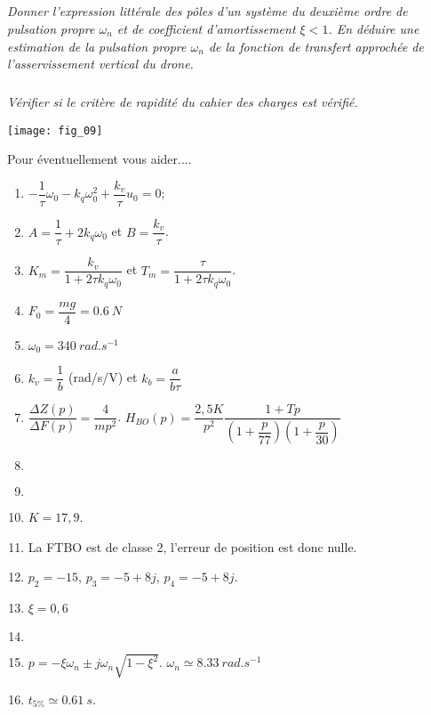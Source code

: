 \begin{multicols}{2}
\subparagraph{}\textit{Donner l’expression littérale des pôles d’un système du deuxième ordre de pulsation propre $\omega_n$ et de coefficient d’amortissement $\xi<1$. En déduire une estimation de la pulsation propre $\omega_n$ de la
fonction de transfert approchée de l’asservissement vertical du drone.}

\subparagraph{}\textit{Vérifier si le critère de rapidité du cahier des charges est vérifié.}

\begin{center}
\texttt{[image: fig\_09]}
\end{center}





Pour éventuellement vous aider....
\begin{enumerate}
\item $-\dfrac{1}{\tau}\omega_0 - k_q \omega_0^2 + \dfrac{k_v}{\tau}u_0=0$;
\item $A=\dfrac{1}{\tau}+2k_q\omega_0$ et $B=\dfrac{k_v}{\tau}$.
\item $K_m=\dfrac{k_v}{1+2\tau k_q \omega_0}$ et $T_m=\dfrac{\tau}{1+2\tau k_q \omega_0}$.
\item $F_0=\dfrac{mg}{4}=\SI{0,6}{N}$
\item $\omega_0=\SI{340}{rad.s^{-1}}$
\item $k_v=\dfrac{1}{b}$ (rad/s/V) et $k_b=\dfrac{a}{b\tau}$
\item $\dfrac{\Delta Z(p)}{\Delta F(p)}=\dfrac{4}{mp^2}$. $H_{BO}(p)=\dfrac{2,5 K}{p^2}\dfrac{1+Tp}{\left( 1+\dfrac{p}{77}\right)\left(1+\dfrac{p}{30} \right)}$ 
\item  $\quad$
\item $\quad$
\item $K=17,9$.
\item La FTBO est de classe 2, l'erreur de position est donc nulle.
\item $p_2=-15$, $p_3 = -5+8j$, $p_4=-5+8j$.
\item $\xi=0,6$
\item $\quad$
\item $p=-\xi\omega_n \pm j\omega_n \sqrt{1-\xi^2}$. $\omega_n\simeq \SI{8,33}{rad.s^{-1}}$
\item $t_{5\%}\simeq \SI{0,61}{ s}$. 
\end{enumerate}
\end{multicols}

%
%
%
%
%
%
